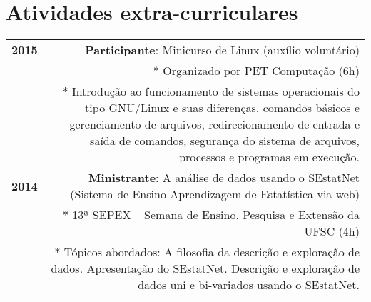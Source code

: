 \documentclass[11pt]{article}
\newcommand \grayrule{\color{lightgray} \vrule}
\newcommand \last{\leftskip0.5cm $\ast$ }
\begin{document}
\section*{Atividades extra-curriculares}
\begin{tabular}{>{\bf}L!{\grayrule}R}

        2015 & \textbf{Participante}: Minicurso de Linux (auxílio voluntário) \\
             & \last Organizado por PET Computação (6h) \\
             & \last Introdução ao funcionamento de sistemas operacionais do
             tipo GNU/Linux e suas diferenças, comandos básicos e gerenciamento
             de arquivos, redirecionamento de entrada e saída de comandos,
             segurança do sistema de arquivos, processos e programas em
             execução. \\ [10pt]

        2014 & \textbf{Ministrante}: A análise de dados usando o SEstatNet
             (Sistema de Ensino-Aprendizagem de Estatística via web) \\
             & \last 13ª SEPEX – Semana de Ensino, Pesquisa e Extensão da
             UFSC (4h) \\
             & \last Tópicos abordados: A filosofia da descrição e exploração
             de dados. Apresentação do SEstatNet. Descrição e exploração de
             dados uni e bi-variados usando o SEstatNet.
\end{tabular}
\end{document}
